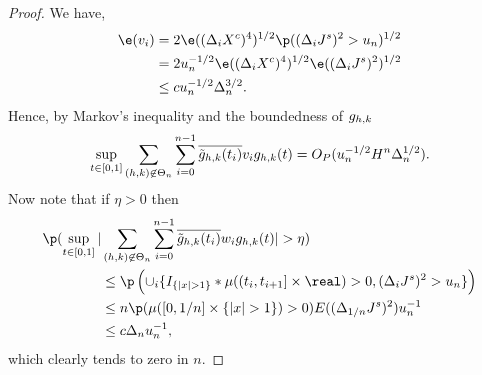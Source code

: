 \begin{proof}
\begin{comment}
    \begin{align}
      \p &\left(  \sup_{t \in \domain}\vert x_n (t) \vert  > \delta\right) \le \p(v_n > \delta/2) + \p(w_n > \delta/2) \notag. 
      \label{}
    \end{align}
  Now let  $\varepsilon > 0$ be given and note that because  $\Lambda$ is almost surely finite,   there is a sufficiently large $K > 0$ such that $\p(\Lambda > K) \le \varepsilon/2$. Hence, 
\end{comment}
We have,
\begin{align} 
  \e(v_i) & = 2 \e( (\dxc)^4)^{1/2} \p( (\djt)^2 > u_n)^{1/2} \notag \\ 
  & = 2 u_n^{-1/2} \e( (\dxc)^4)^{1/2} \e( (\djt)^2)^{1/2} \notag \\ 
  & \le c u_n^{-1/2}\Delta_n^{3/2} \label{eq:vi}.
\end{align}
Hence,  by Markov's inequality and the boundedness of $g_{h,k}$ \begin{align} \sup_{t \in [0,1]}\sum_{(h,k) \not\in \Theta_n} \sum_{i = 0}^{n-1} \overline{\tilde{g}_{h,k}(t_i)} v_i g_{h,k}(t) = O_P(u_n^{-1/2}H^n \Delta_n^{1/2}).\end{align} 
Now note that if $\eta >  0$ then   
\begin{align} 
  \p( \sup_{t \in \domain}\vert &\sumnt \sumin \btghki w_i \ghk(t)\vert > \eta) \notag \\
  &\le \p\left(\cup_i\{I_{\{\vert x \vert > 1\}}\ast \mu( (t_i, t_{i + 1}] \times \real) > 0   , (\djt)^2 > u_n\}\right) \notag \\ 
  & \le n \p(\mu( [0, 1/n] \times \{\vert x \vert > 1\}) > 0 ) E( (\Delta_{1/n} J^s)^2) u_n^{-1} \notag \\ 
  & \le c \Delta_n u_n^{-1}\notag,
\end{align} 
which clearly tends to zero in $n$.
  \begin{comment}
\p(v_n > \delta /2) & \le 2cKH_n\delta^{-1}E(n^{-1} \log(n) \sumin I_{\{(\djt)^2 > u_n\}}) + \p(\Lambda > K) \notag  \\ & = 2cK H_n\delta^{-1}\log(n) \p( (\Delta_{1/n}J^s)^2 > u_n)  + \varepsilon/2 \notag \\ &\le  2cK H_n\delta^{-1}\log(n) E((\Delta_{1/n} J^s)^2))u_n^{-1}   + \varepsilon/2 \notag \\ &\le 2cKH_n\delta^{-1} \log(n) n^{-1}\kappa u_n^{-1} +  \varepsilon/2\label{eq:asabove} \end{align} where $\kappa := E((\Delta_1 J^s)^2)) < \infty$.  Obviously there is a large enough $n$ such that the first expression above is less than or equal to $\varepsilon/2$.

\end{comment}
\end{proof}
